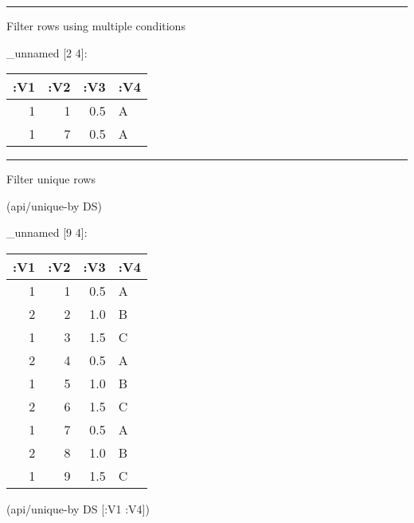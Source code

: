 \documentclass[]{article}
\newenvironment{Shaded}{\begin{snugshade}}{\end{snugshade}}
\newcommand{\KeywordTok}[1]{\textcolor[rgb]{0.13,0.29,0.53}{\textbf{#1}}}
\newcommand{\DecValTok}[1]{\textcolor[rgb]{0.00,0.00,0.81}{#1}}
\newcommand{\StringTok}[1]{\textcolor[rgb]{0.31,0.60,0.02}{#1}}
\newcommand{\VariableTok}[1]{\textcolor[rgb]{0.00,0.00,0.00}{#1}}
\newcommand{\AttributeTok}[1]{\textcolor[rgb]{0.77,0.63,0.00}{#1}}
\newcommand{\NormalTok}[1]{#1}
\begin{document}
\begin{center}\rule{0.5\linewidth}{0.5pt}\end{center}

Filter rows using multiple conditions

\begin{Shaded}
\end{Shaded}

\_unnamed {[}2 4{]}:

\begin{longtable}[]{@{}rrrl@{}}
\toprule
:V1 & :V2 & :V3 & :V4\tabularnewline
\midrule
\endhead
1 & 1 & 0.5 & A\tabularnewline
1 & 7 & 0.5 & A\tabularnewline
\bottomrule
\end{longtable}

\begin{center}\rule{0.5\linewidth}{0.5pt}\end{center}

Filter unique rows

\begin{Shaded}
\begin{Highlighting}[]
\NormalTok{(api/unique-by DS)}
\end{Highlighting}
\end{Shaded}

\_unnamed {[}9 4{]}:

\begin{longtable}[]{@{}rrrl@{}}
\toprule
:V1 & :V2 & :V3 & :V4\tabularnewline
\midrule
\endhead
1 & 1 & 0.5 & A\tabularnewline
2 & 2 & 1.0 & B\tabularnewline
1 & 3 & 1.5 & C\tabularnewline
2 & 4 & 0.5 & A\tabularnewline
1 & 5 & 1.0 & B\tabularnewline
2 & 6 & 1.5 & C\tabularnewline
1 & 7 & 0.5 & A\tabularnewline
2 & 8 & 1.0 & B\tabularnewline
1 & 9 & 1.5 & C\tabularnewline
\bottomrule
\end{longtable}

\begin{Shaded}
\begin{Highlighting}[]
\NormalTok{(api/unique-by DS [}\AttributeTok{:V1} \AttributeTok{:V4}\NormalTok{])}
\end{Highlighting}
\end{Shaded}
\end{document}
